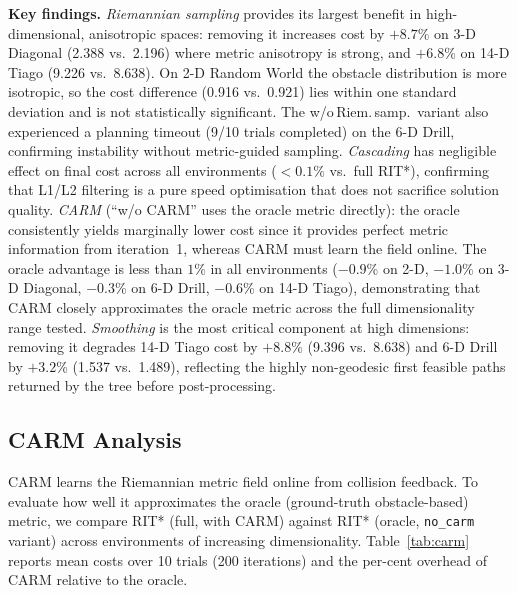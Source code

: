 \documentclass[journal]{IEEEtran}
\begin{document}
\textbf{Key findings.}
\emph{Riemannian sampling} provides its largest benefit in
high-dimensional, anisotropic spaces: removing it increases cost by
$+8.7\%$ on 3-D Diagonal (2.388 vs.\ 2.196) where metric anisotropy is
strong, and $+6.8\%$ on 14-D Tiago (9.226 vs.\ 8.638).
On 2-D Random World the obstacle distribution is more isotropic, so the
cost difference (0.916 vs.\ 0.921) lies within one standard deviation and
is not statistically significant. The w/o\,Riem.\,samp.\ variant also
experienced a planning timeout (9/10 trials completed) on the 6-D Drill,
confirming instability without metric-guided sampling.
\emph{Cascading} has negligible effect on final cost across all
environments ($<0.1\%$ vs.\ full RIT*), confirming that L1/L2
filtering is a pure speed optimisation that does not sacrifice
solution quality.
\emph{CARM} (``w/o CARM'' uses the oracle metric directly): the
oracle consistently yields marginally lower cost since it provides
perfect metric information from iteration~1, whereas CARM must learn
the field online. The oracle advantage is less than $1\%$ in all
environments ($-0.9\%$ on 2-D, $-1.0\%$ on 3-D Diagonal, $-0.3\%$
on 6-D Drill, $-0.6\%$ on 14-D Tiago), demonstrating that CARM
closely approximates the oracle metric across the full dimensionality
range tested.
\emph{Smoothing} is the most critical component at high dimensions:
removing it degrades 14-D Tiago cost by $+8.8\%$ (9.396 vs.\ 8.638)
and 6-D Drill by $+3.2\%$ (1.537 vs.\ 1.489), reflecting the highly
non-geodesic first feasible paths returned by the tree before
post-processing.


\subsection{CARM Analysis}\label{sec:carm_analysis}

CARM learns the Riemannian metric field online from collision feedback.
To evaluate how well it approximates the oracle (ground-truth
obstacle-based) metric, we compare RIT* (full, with CARM) against
RIT* (oracle, \texttt{no\_carm} variant) across environments of
increasing dimensionality.
Table~\ref{tab:carm} reports mean costs over 10 trials (200 iterations)
and the per-cent overhead of CARM relative to the oracle.
\end{document}
